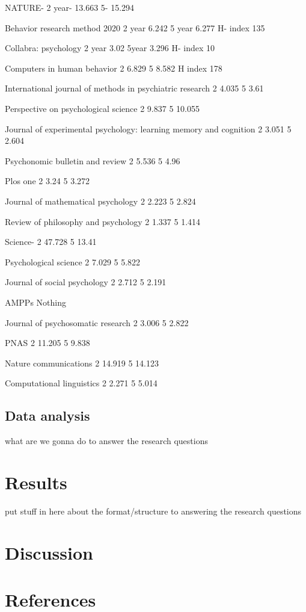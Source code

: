 \documentclass[
  english,
  man]{apa6}
\newlength{\cslhangindent}
\newlength{\cslentryspacingunit} %
\newenvironment{CSLReferences}[2] %
 {%
  \setlength{\parindent}{0pt}
  \ifodd #1
  \let\oldpar\par
  \def\par{\hangindent=\cslhangindent\oldpar}
  \fi
  \setlength{\parskip}{#2\cslentryspacingunit}
 }%
 {}
\begin{document}
NATURE- 
2 year- 13.663
5- 15.294

Behavior research method 2020
2 year 6.242
5 year 6.277
H- index 135

Collabra: psychology 
2 year 3.02
5year 3.296
H- index  10

Computers in human behavior
2 6.829
5 8.582
H index 178

International journal of methods in psychiatric research
2 4.035
5 3.61 

Perspective on psychological science 
2 9.837
5 10.055 

Journal of experimental psychology: learning memory and cognition 
2 3.051
5 2.604 

Psychonomic  bulletin and review 
2 5.536
5 4.96

Plos one 
2 3.24
5 3.272

Journal of mathematical psychology 
2 2.223 
5 2.824

Review of philosophy and psychology 
2 1.337 
5 1.414

Science- 
2 47.728
5 13.41 

Psychological science 
2 7.029 
5 5.822

Journal of social psychology 
2 2.712
5 2.191

AMPPs 
Nothing 

Journal of psychosomatic research 
2 3.006
5 2.822

PNAS 
2 11.205
5 9.838

Nature communications
2 14.919
5 14.123 

Computational linguistics 
2 2.271
5 5.014 

\hypertarget{data-analysis}{%
\subsection{Data analysis}\label{data-analysis}}

what are we gonna do to answer the research questions

\hypertarget{results}{%
\section{Results}\label{results}}

put stuff in here about the format/structure to answering the research questions

\hypertarget{discussion}{%
\section{Discussion}\label{discussion}}

\newpage

\hypertarget{references}{%
\section{References}\label{references}}

\begingroup
\setlength{\parindent}{-0.5in}
\setlength{\leftskip}{0.5in}

\hypertarget{refs}{}
\begin{CSLReferences}{0}{0}
\end{CSLReferences}

\endgroup
\end{document}

